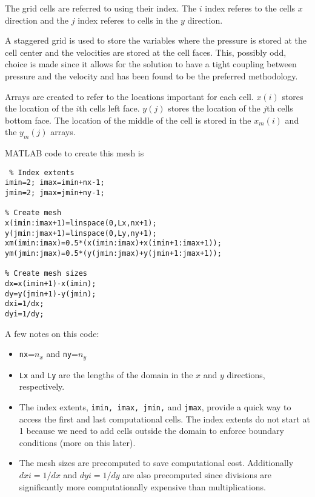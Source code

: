 \documentclass[]{article}
\begin{document}
The grid cells are referred to using their index.  The $i$ index referes to the cells $x$ direction and the $j$ index referes to cells in the $y$ direction.

A staggered grid is used to store the variables where the pressure is stored at the cell center and the velocities are stored at the cell faces.  This, possibly odd, choice is made since it allows for the solution to have a tight coupling between pressure and the velocity and has been found to be the preferred methodology.

Arrays are created to refer to the locations important for each cell.  $x(i)$ stores the location of the $i$th cells left face. $y(j)$ stores the location of the $j$th cells bottom face.  The location of the middle of the cell is stored in the $x_m(i)$ and the $y_m(j)$ arrays.

MATLAB code to create this mesh is 
\begin{lstlisting}
 % Index extents
imin=2; imax=imin+nx-1;
jmin=2; jmax=jmin+ny-1;

% Create mesh
x(imin:imax+1)=linspace(0,Lx,nx+1);
y(jmin:jmax+1)=linspace(0,Ly,ny+1);
xm(imin:imax)=0.5*(x(imin:imax)+x(imin+1:imax+1));
ym(jmin:jmax)=0.5*(y(jmin:jmax)+y(jmin+1:jmax+1));

% Create mesh sizes
dx=x(imin+1)-x(imin);
dy=y(jmin+1)-y(jmin); 
dxi=1/dx; 
dyi=1/dy;
\end{lstlisting}
A few notes on this code:
\begin{itemize}
\item \lstinline{nx}=$n_x$ and  \lstinline{ny}=$n_y$
\item  \lstinline{Lx} and \lstinline{Ly} are the lengths of the domain in the $x$ and $y$ directions, respectively.
\item  The index extents, \lstinline{imin, imax, jmin,} and \lstinline{jmax}, provide a quick way to access the first and last computational cells.  The index extents do not start at 1 because we need to add cells outside the domain to enforce boundary conditions (more on this later).  
\item The mesh sizes are precomputed to save computational cost.   Additionally $dxi=1/dx$ and $dyi=1/dy$ are also precomputed since divisions are significantly more computationally expensive than multiplications.
\end{itemize}
\end{document}
